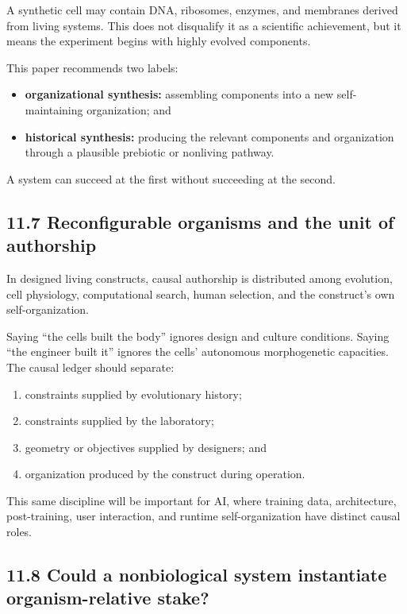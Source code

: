 \documentclass[
  11pt,
]{article}
\providecommand{\tightlist}{%
  \setlength{\itemsep}{0pt}\setlength{\parskip}{0pt}}
\begin{document}
A synthetic cell may contain DNA, ribosomes, enzymes, and membranes
derived from living systems. This does not disqualify it as a scientific
achievement, but it means the experiment begins with highly evolved
components.

This paper recommends two labels:

\begin{itemize}
\tightlist
\item
  \textbf{organizational synthesis:} assembling components into a new
  self-maintaining organization; and
\item
  \textbf{historical synthesis:} producing the relevant components and
  organization through a plausible prebiotic or nonliving pathway.
\end{itemize}

A system can succeed at the first without succeeding at the second.

\subsection{11.7 Reconfigurable organisms and the unit of
authorship}\label{reconfigurable-organisms-and-the-unit-of-authorship}

In designed living constructs, causal authorship is distributed among
evolution, cell physiology, computational search, human selection, and
the construct's own self-organization.

Saying ``the cells built the body'' ignores design and culture
conditions. Saying ``the engineer built it'' ignores the cells'
autonomous morphogenetic capacities. The causal ledger should separate:

\begin{enumerate}
\def\labelenumi{\arabic{enumi}.}
\tightlist
\item
  constraints supplied by evolutionary history;
\item
  constraints supplied by the laboratory;
\item
  geometry or objectives supplied by designers; and
\item
  organization produced by the construct during operation.
\end{enumerate}

This same discipline will be important for AI, where training data,
architecture, post-training, user interaction, and runtime
self-organization have distinct causal roles.

\subsection{11.8 Could a nonbiological system instantiate
organism-relative
stake?}\label{could-a-nonbiological-system-instantiate-organism-relative-stake}
\end{document}
